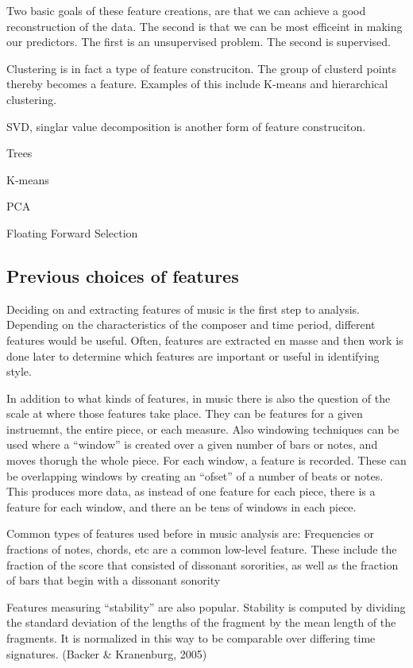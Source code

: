 \documentclass[12pt,twoside]{reedthesis}
\theoremstyle{definition}
\theoremstyle{definition}
\theoremstyle{definition}
\theoremstyle{remark}
\begin{document}
Two basic goals of these feature creations, are that we can achieve a
good reconstruction of the data. The second is that we can be most
efficeint in making our predictors. The first is an unsupervised
problem. The second is supervised.

Clustering is in fact a type of feature construciton. The group of
clusterd points thereby becomes a feature. Examples of this include
K-means and hierarchical clustering.

SVD, singlar value decomposition is another form of feature
construciton.

Trees

K-means

PCA

Floating Forward Selection

\subsection{Previous choices of
features}\label{previous-choices-of-features}

Deciding on and extracting features of music is the first step to
analysis. Depending on the characteristics of the composer and time
period, different features would be useful. Often, features are
extracted en masse and then work is done later to determine which
features are important or useful in identifying style.

In addition to what kinds of features, in music there is also the
question of the scale at where those features take place. They can be
features for a given instruemnt, the entire piece, or each measure. Also
windowing techniques can be used where a ``window'' is created over a
given number of bars or notes, and moves thorugh the whole piece. For
each window, a feature is recorded. These can be overlapping windows by
creating an ``ofset'' of a number of beats or notes. This produces more
data, as instead of one feature for each piece, there is a feature for
each window, and there an be tens of windows in each piece.

Common types of features used before in music analysis are: Frequencies
or fractions of notes, chords, etc are a common low-level feature. These
include the fraction of the score that consisted of dissonant
sororities, as well as the fraction of bars that begin with a dissonant
sonority

Features measuring ``stability'' are also popular. Stability is computed
by dividing the standard deviation of the lengths of the fragment by the
mean length of the fragments. It is normalized in this way to be
comparable over differing time signatures. (Backer \& Kranenburg, 2005)
\end{document}
